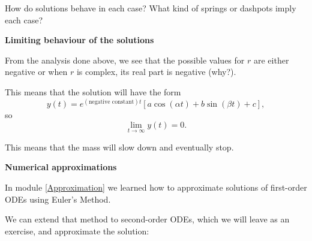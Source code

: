 How do solutions behave in each case?
What kind of springs or dashpots imply each case?





\hfill

\begin{center}
\textbf{\color{cyan}
Limiting behaviour of the solutions
}
\end{center}


From the analysis done above, we see that the possible values for $r$ are either negative or when $r$ is complex, its real part is negative (why?).

This means that the solution will have the form
$$
y(t) = e^{(\text{negative constant}) t} \left[  a\cos(\alpha t) + b\sin(\beta t) + c\right],
$$
so 
$$
\lim_{t \to \infty} y(t) = 0.
$$

This means that the mass will slow down and eventually stop.


\hfill

\begin{center}
\textbf{\color{cyan}
Numerical approximations
}
\end{center}



In module \ref{Approximation} we learned how to approximate solutions of first-order ODEs using Euler's Method.

We can extend that method to second-order ODEs, which we will leave as an exercise, and approximate the solution:

